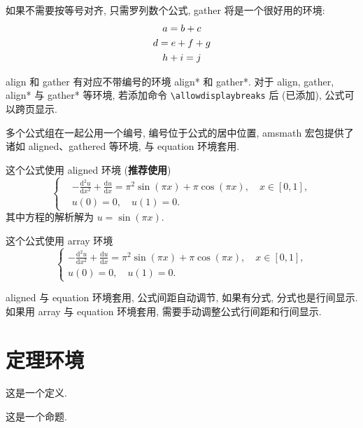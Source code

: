 如果不需要按等号对齐, 只需罗列数个公式, gather 将是一个很好用的环境:
\begin{gather}
a = b + c \\
d = e + f + g \notag \\
h + i = j
\end{gather}

align 和 gather 有对应不带编号的环境 align* 和 gather*.
对于 align, gather, align* 与 gather* 等环境, 若添加命令 \verb|\allowdisplaybreaks| 后 (已添加), 公式可以跨页显示.

多个公式组在一起公用一个编号, 编号位于公式的居中位置, amsmath 宏包提供了诸如 aligned、gathered 等环境, 与 equation 环境套用.

这个公式使用 aligned 环境 (\textbf{推荐使用})
\begin{equation}\label{eq:alignedEq}
\left\{\begin{aligned}
  &-\frac{\mathrm{d}^{2} u}{\mathrm{d} x^{2}}+\frac{\mathrm{d} u}{\mathrm{d} x}=\pi^{2} \sin (\pi x)+\pi \cos (\pi x),\quad x \in [0,1], \\
  &u(0)=0,\quad u(1)=0.
\end{aligned} \right.
\end{equation}
其中方程的解析解为 $u=\sin(\pi x)$.

这个公式使用 array 环境
\begin{equation}\label{eq:arrayEq}
\left\{\begin{array}{l}
\displaystyle
-\frac{\mathrm{d}^{2} u}{\mathrm{d} x^{2}}+\frac{\mathrm{d} u}{\mathrm{d} x}=\pi^{2} \sin (\pi x)+\pi \cos (\pi x),\quad x \in [0,1], \\[6pt]
u(0)=0,\quad u(1)=0.
\end{array} \right.
\end{equation}

aligned 与 equation 环境套用, 公式间距自动调节, 如果有分式, 分式也是行间显示. 如果用 array 与 equation 环境套用, 需要手动调整公式行间距和行间显示.


\section{定理环境}

\begin{definition}\label{def:foo}
这是一个定义.
\end{definition}

\begin{proposition}\label{prop:foo}
这是一个命题.
\end{proposition}

